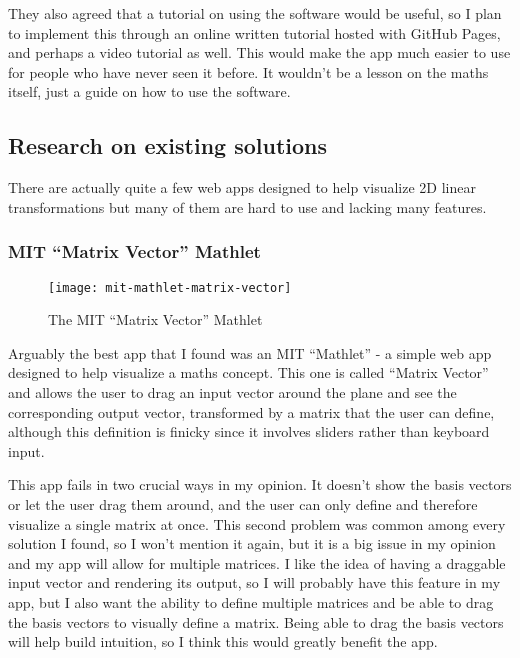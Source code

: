 \documentclass[../main.tex]{subfiles}
\begin{document}
They also agreed that a tutorial on using the software would be useful, so I plan to implement this through an online written tutorial hosted with GitHub Pages, and perhaps a video tutorial as well. This would make the app much easier to use for people who have never seen it before. It wouldn't be a lesson on the maths itself, just a guide on how to use the software.

\subsection{Research on existing solutions\label{subsection:research-on-existing-solutions}}

There are actually quite a few web apps designed to help visualize 2D linear transformations but many of them are hard to use and lacking many features.

\subsubsection{MIT \enquote{Matrix Vector} Mathlet\label{subsubsection:mit-mathlet-matrix-vector}}

\begin{wrapfigure}{R}{0.5\linewidth}
	\vspace{-1em}
	\centering
	\texttt{[image: mit-mathlet-matrix-vector]}
	\caption{The MIT \enquote{Matrix Vector} Mathlet}
	\label{fig:mit-mathlet-matrix-vector}
	\vspace{-1em}
\end{wrapfigure}

Arguably the best app that I found was an MIT \enquote{Mathlet} - a simple web app designed to help visualize a maths concept. This one is called \enquote{Matrix Vector}\cite{mit-mathlet-matrix-vector} and allows the user to drag an input vector around the plane and see the corresponding output vector, transformed by a matrix that the user can define, although this definition is finicky since it involves sliders rather than keyboard input.

This app fails in two crucial ways in my opinion. It doesn't show the basis vectors or let the user drag them around, and the user can only define and therefore visualize a single matrix at once. This second problem was common among every solution I found, so I won't mention it again, but it is a big issue in my opinion and my app will allow for multiple matrices. I like the idea of having a draggable input vector and rendering its output, so I will probably have this feature in my app, but I also want the ability to define multiple matrices and be able to drag the basis vectors to visually define a matrix. Being able to drag the basis vectors will help build intuition, so I think this would greatly benefit the app.
\end{document}
